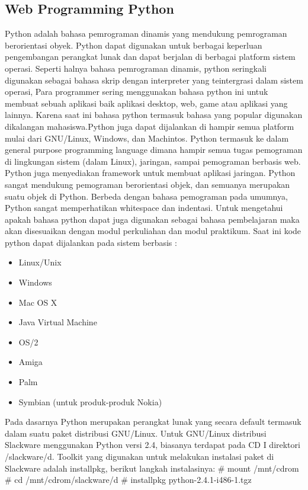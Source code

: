 \subsection {Web Programming Python}
Python adalah bahasa pemrograman dinamis yang mendukung pemrograman berorientasi obyek. Python dapat digunakan untuk berbagai keperluan pengembangan perangkat lunak dan dapat berjalan di berbagai platform sistem operasi. Seperti halnya bahasa pemrograman dinamis, python seringkali digunakan sebagai bahasa skrip dengan interpreter yang teintergrasi dalam sistem operasi, Para programmer sering menggunakan bahasa python ini untuk membuat sebuah aplikasi baik aplikasi desktop, web, game atau aplikasi yang lainnya. Karena saat ini bahasa python termasuk bahasa yang popular digunakan dikalangan mahasiswa.Python juga dapat dijalankan di hampir semua platform mulai dari GNU/Linux, Windows, dan Machintos. Python termasuk ke dalam general purpose programming language dimana hampir semua tugas pemograman di lingkungan sistem (dalam Linux), jaringan, sampai pemograman berbasis web. Python juga menyediakan framework untuk membuat aplikasi jaringan. Python sangat mendukung pemograman berorientasi objek, dan semuanya merupakan suatu objek di Python. Berbeda dengan bahasa pemograman pada umumnya, Python sangat memperhatikan whitespace dan indentasi. Untuk mengetahui apakah bahasa python dapat juga digunakan sebagai bahasa pembelajaran maka akan disesuaikan dengan modul perkuliahan dan modul praktikum. Saat ini kode python dapat dijalankan pada sistem berbasis \cite{swaroop2003byte}:
\begin{itemize}
	\item Linux/Unix
	\item Windows
	\item Mac OS X 
	\item Java Virtual Machine 
	\item OS/2 
	\item Amiga 
	\item Palm 
	\item Symbian (untuk produk-produk Nokia) \end{itemize}
Pada dasarnya Python merupakan perangkat lunak yang secara default termasuk dalam suatu paket distribusi GNU/Linux. Untuk GNU/Linux distribusi Slackware menggunakan Python versi 2.4, biasanya terdapat pada CD I direktori /slackware/d. Toolkit yang digunakan untuk melakukan instalasi paket di Slackware adalah installpkg, berikut langkah instalasinya: 
# mount /mnt/cdrom 
# cd /mnt/cdrom/slackware/d 
# installpkg python-2.4.1-i486-1.tgz 
